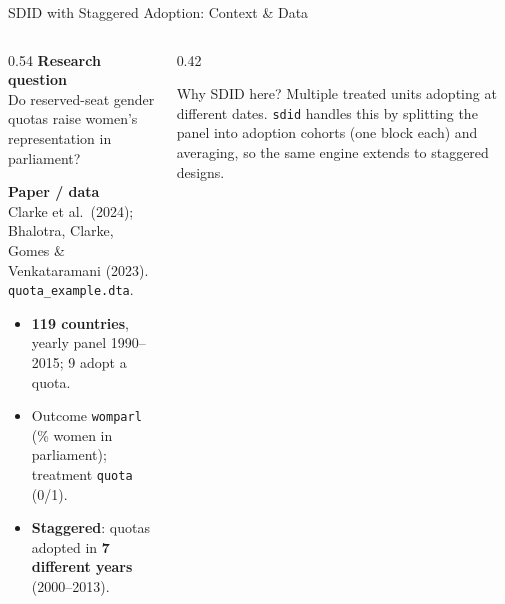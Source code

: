\documentclass[main.tex]{subfiles}
\begin{document}
\begin{frame}{SDID with Staggered Adoption: Context \& Data}

  \begin{columns}[T]
    \begin{column}{0.54\textwidth}
      \textbf{Research question}\\
      Do reserved-seat gender quotas raise women's representation in
      parliament?

      \medskip
      \textbf{Paper / data}\\
      Clarke et al.\ (2024); Bhalotra, Clarke, Gomes \& Venkataramani
      (2023). \texttt{quota\_example.dta}.
      \begin{itemize}\small
        \item \textbf{119 countries}, yearly panel 1990--2015; 9 adopt a
          quota.
        \item Outcome \texttt{womparl} (\% women in parliament);
          treatment \texttt{quota} (0/1).
        \item \textbf{Staggered}: quotas adopted in \textbf{7 different
          years} (2000--2013).
      \end{itemize}
    \end{column}
    \begin{column}{0.42\textwidth}
      \begin{block}{Why SDID here?}
        \footnotesize
        Multiple treated units adopting at different dates. \texttt{sdid}
        handles this by splitting the panel into adoption cohorts (one
        block each) and averaging, so the same engine extends to
        staggered designs.
      \end{block}
    \end{column}
  \end{columns}

\end{frame}
\end{document}
